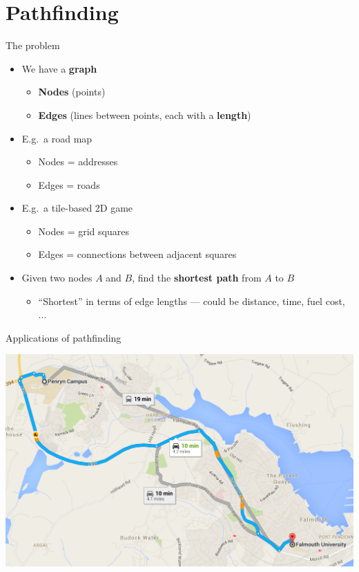 \part{Pathfinding}
\frame{\partpage}

\begin{frame}{The problem}
    \begin{itemize}
        \item We have a \textbf{graph} \pause
            \begin{itemize}
                \item \textbf{Nodes} (points) \pause
                \item \textbf{Edges} (lines between points, each with a \textbf{length}) \pause
            \end{itemize}
        \item E.g.\ a road map \pause
            \begin{itemize}
                \item Nodes = addresses \pause
                \item Edges = roads \pause
            \end{itemize}
        \item E.g.\ a tile-based 2D game \pause
            \begin{itemize}
                \item Nodes = grid squares \pause
                \item Edges = connections between adjacent squares \pause
            \end{itemize}
        \item Given two nodes $A$ and $B$, find the \textbf{shortest path} from $A$ to $B$ \pause
            \begin{itemize}
                \item ``Shortest'' in terms of edge lengths --- could be distance, time, fuel cost, ...
            \end{itemize}
    \end{itemize}
\end{frame}

\begin{frame}{Applications of pathfinding}
    \begin{center}
        \includegraphics[width=\textwidth]{pathfinding_1}
    \end{center}
\end{frame}

